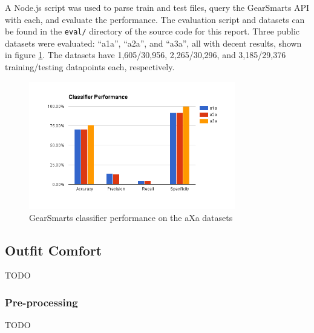 A Node.js script was used to parse train and test files, query the GearSmarts API with each, and evaluate the performance.
The evaluation script and datasets can be found in the \texttt{eval/} directory of the source code for this report.
Three public datasets were evaluated: ``a1a'', ``a2a'', and ``a3a'', all with decent results, shown in figure \ref{fig:aXa}.
The datasets have 1,605/30,956, 2,265/30,296, and 3,185/29,376 training/testing datapoints each, respectively.

\begin{figure}[ht!]
    \centering
    \includegraphics[width=90mm]{img/aXa.png}
    \caption{GearSmarts classifier performance on the aXa datasets}
    \label{fig:aXa}
\end{figure}

\subsection{Outfit Comfort}
TODO

\subsubsection{Pre-processing}
\label{subsection:preprocessing}

TODO